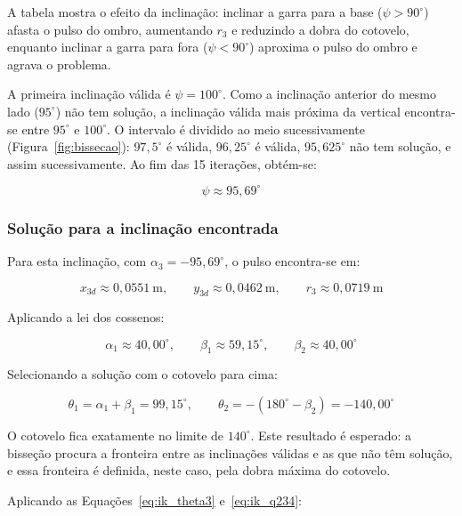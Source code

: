 A tabela mostra o efeito da inclinação: inclinar a garra para a base ($\psi>90^\circ$) afasta o pulso do ombro, aumentando $r_3$ e reduzindo a dobra do cotovelo, enquanto inclinar a garra para fora ($\psi<90^\circ$) aproxima o pulso do ombro e agrava o problema.

A primeira inclinação válida é $\psi=100^\circ$. Como a inclinação anterior do mesmo lado ($95^\circ$) não tem solução, a inclinação válida mais próxima da vertical encontra-se entre $95^\circ$ e $100^\circ$. O intervalo é dividido ao meio sucessivamente (Figura~\ref{fig:bissecao}): $97{,}5^\circ$ é válida, $96{,}25^\circ$ é válida, $95{,}625^\circ$ não tem solução, e assim sucessivamente. Ao fim das 15 iterações, obtém-se:

\begin{equation}
    \psi\approx95{,}69^\circ
\end{equation}

\subsubsection*{Solução para a inclinação encontrada}

Para esta inclinação, com $\alpha_3=-95{,}69^\circ$, o pulso encontra-se em:

\begin{equation}
    x_{3d}\approx0{,}0551\ \text{m},\qquad
    y_{3d}\approx0{,}0462\ \text{m},\qquad
    r_3\approx0{,}0719\ \text{m}
\end{equation}

Aplicando a lei dos cossenos:

\begin{equation}
    \alpha_1\approx40{,}00^\circ,\qquad
    \beta_1\approx59{,}15^\circ,\qquad
    \beta_2\approx40{,}00^\circ
\end{equation}

Selecionando a solução com o cotovelo para cima:

\begin{equation}
    \theta_1=\alpha_1+\beta_1=99{,}15^\circ,\qquad
    \theta_2=-(180^\circ-\beta_2)=-140{,}00^\circ
\end{equation}

O cotovelo fica exatamente no limite de $140^\circ$. Este resultado é esperado: a bisseção procura a fronteira entre as inclinações válidas e as que não têm solução, e essa fronteira é definida, neste caso, pela dobra máxima do cotovelo.

Aplicando as Equações~\eqref{eq:ik_theta3} e~\eqref{eq:ik_q234}:


